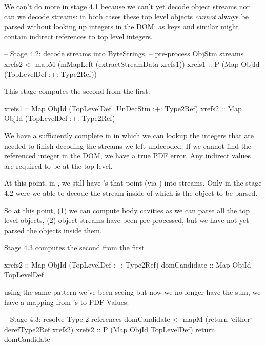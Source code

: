 We can't do more in stage 4.1 because we can't yet decode
object streams nor can we decode streams: in both cases these top
level objects \emph{cannot} always be parsed without looking up
integers in the DOM: as  keys and similar might contain
indirect references to top level integers.

\begin{code}
    -- Stage 4.2: decode streams into ByteStrings,
    --            pre-process ObjStm streams
    xrefs2 <- mapM
                (mMapLeft (extractStreamData xrefs1))
                xrefs1
              :: P (Map ObjId (TopLevelDef :+: Type2Ref))
\end{code}
This stage computes the second from the first:
\begin{codeNoExecute}
  xrefs1 :: Map ObjId (TopLevelDef_UnDecStm :+: Type2Ref)
  xrefs2 :: Map ObjId (TopLevelDef          :+: Type2Ref) 
\end{codeNoExecute}
We have a sufficiently complete  in  in which
we can lookup the integers that are needed to finish decoding the
streams we left undecoded.
If we cannot find the referenced integer in the DOM, we have a true PDF
error.  Any indirect  values are required to be at the
top level.

At this point, in , we still have 's that point
(via ) into  streams.
Only in the stage 4.2 were we able to decode the stream inside of
which is the object to be parsed.


So at this point, (1) we can compute body cavities  as
we can parse all the top level objects, (2) object streams have been
pre-processed, but we have not yet parsed the objects inside them.

Stage 4.3 computes the second from the first
\begin{codeNoExecute}
  xrefs2       :: Map ObjId (TopLevelDef :+: Type2Ref) 
  domCandidate :: Map ObjId TopLevelDef
\end{codeNoExecute}
using the same pattern we've been seeing but now we no longer have 
the sum, we have a mapping from 's to PDF Values:
\begin{code}
    -- Stage 4.3: resolve Type 2 references
    domCandidate <- mapM
                     (return `either` derefType2Ref xrefs2)
                     xrefs2
                    :: P (Map ObjId TopLevelDef)
    return domCandidate
\end{code}

